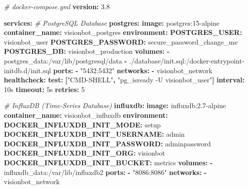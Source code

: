 \documentclass[
]{article}
\newenvironment{Shaded}{\begin{snugshade}}{\end{snugshade}}
\newcommand{\AttributeTok}[1]{\textcolor[rgb]{0.13,0.29,0.53}{#1}}
\newcommand{\CommentTok}[1]{\textcolor[rgb]{0.56,0.35,0.01}{\textit{#1}}}
\newcommand{\DecValTok}[1]{\textcolor[rgb]{0.00,0.00,0.81}{#1}}
\newcommand{\FunctionTok}[1]{\textcolor[rgb]{0.13,0.29,0.53}{\textbf{#1}}}
\newcommand{\KeywordTok}[1]{\textcolor[rgb]{0.13,0.29,0.53}{\textbf{#1}}}
\newcommand{\StringTok}[1]{\textcolor[rgb]{0.31,0.60,0.02}{#1}}
\begin{document}
\begin{Shaded}
\begin{Highlighting}[]
\CommentTok{\# docker{-}compose.yml}
\FunctionTok{version}\KeywordTok{:}\AttributeTok{ }\StringTok{\textquotesingle{}3.8\textquotesingle{}}

\FunctionTok{services}\KeywordTok{:}
\CommentTok{  \# PostgreSQL Database}
\AttributeTok{  }\FunctionTok{postgres}\KeywordTok{:}
\AttributeTok{    }\FunctionTok{image}\KeywordTok{:}\AttributeTok{ postgres:15{-}alpine}
\AttributeTok{    }\FunctionTok{container\_name}\KeywordTok{:}\AttributeTok{ visionbot\_postgres}
\AttributeTok{    }\FunctionTok{environment}\KeywordTok{:}
\AttributeTok{      }\FunctionTok{POSTGRES\_USER}\KeywordTok{:}\AttributeTok{ visionbot\_user}
\AttributeTok{      }\FunctionTok{POSTGRES\_PASSWORD}\KeywordTok{:}\AttributeTok{ secure\_password\_change\_me}
\AttributeTok{      }\FunctionTok{POSTGRES\_DB}\KeywordTok{:}\AttributeTok{ visionbot\_production}
\AttributeTok{    }\FunctionTok{volumes}\KeywordTok{:}
\AttributeTok{      }\KeywordTok{{-}}\AttributeTok{ postgres\_data:/var/lib/postgresql/data}
\AttributeTok{      }\KeywordTok{{-}}\AttributeTok{ ./database/init.sql:/docker{-}entrypoint{-}initdb.d/init.sql}
\AttributeTok{    }\FunctionTok{ports}\KeywordTok{:}
\AttributeTok{      }\KeywordTok{{-}}\AttributeTok{ }\StringTok{"5432:5432"}
\AttributeTok{    }\FunctionTok{networks}\KeywordTok{:}
\AttributeTok{      }\KeywordTok{{-}}\AttributeTok{ visionbot\_network}
\AttributeTok{    }\FunctionTok{healthcheck}\KeywordTok{:}
\AttributeTok{      }\FunctionTok{test}\KeywordTok{:}\AttributeTok{ }\KeywordTok{[}\StringTok{"CMD{-}SHELL"}\KeywordTok{,}\AttributeTok{ }\StringTok{"pg\_isready {-}U visionbot\_user"}\KeywordTok{]}
\AttributeTok{      }\FunctionTok{interval}\KeywordTok{:}\AttributeTok{ 10s}
\AttributeTok{      }\FunctionTok{timeout}\KeywordTok{:}\AttributeTok{ 5s}
\AttributeTok{      }\FunctionTok{retries}\KeywordTok{:}\AttributeTok{ }\DecValTok{5}

\CommentTok{  \# InfluxDB (Time{-}Series Database)}
\AttributeTok{  }\FunctionTok{influxdb}\KeywordTok{:}
\AttributeTok{    }\FunctionTok{image}\KeywordTok{:}\AttributeTok{ influxdb:2.7{-}alpine}
\AttributeTok{    }\FunctionTok{container\_name}\KeywordTok{:}\AttributeTok{ visionbot\_influxdb}
\AttributeTok{    }\FunctionTok{environment}\KeywordTok{:}
\AttributeTok{      }\FunctionTok{DOCKER\_INFLUXDB\_INIT\_MODE}\KeywordTok{:}\AttributeTok{ setup}
\AttributeTok{      }\FunctionTok{DOCKER\_INFLUXDB\_INIT\_USERNAME}\KeywordTok{:}\AttributeTok{ admin}
\AttributeTok{      }\FunctionTok{DOCKER\_INFLUXDB\_INIT\_PASSWORD}\KeywordTok{:}\AttributeTok{ adminpassword}
\AttributeTok{      }\FunctionTok{DOCKER\_INFLUXDB\_INIT\_ORG}\KeywordTok{:}\AttributeTok{ visionbot}
\AttributeTok{      }\FunctionTok{DOCKER\_INFLUXDB\_INIT\_BUCKET}\KeywordTok{:}\AttributeTok{ metrics}
\AttributeTok{    }\FunctionTok{volumes}\KeywordTok{:}
\AttributeTok{      }\KeywordTok{{-}}\AttributeTok{ influxdb\_data:/var/lib/influxdb2}
\AttributeTok{    }\FunctionTok{ports}\KeywordTok{:}
\AttributeTok{      }\KeywordTok{{-}}\AttributeTok{ }\StringTok{"8086:8086"}
\AttributeTok{    }\FunctionTok{networks}\KeywordTok{:}
\AttributeTok{      }\KeywordTok{{-}}\AttributeTok{ visionbot\_network}


\end{Highlighting}
\end{Shaded}
\end{document}
